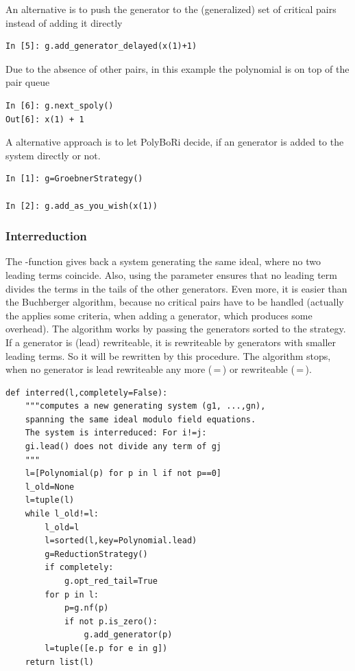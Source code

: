 An alternative is to push the generator to the (generalized) set of critical pairs instead of adding it directly
\begin{lstlisting}
In [5]: g.add_generator_delayed(x(1)+1)
\end{lstlisting}
Due to the absence of other pairs, in this example the polynomial is on top of the pair queue
\begin{lstlisting}
In [6]: g.next_spoly()
Out[6]: x(1) + 1
\end{lstlisting}

A alternative approach is to let PolyBoRi decide, if an generator is added to the system directly or not.
\begin{lstlisting}
In [1]: g=GroebnerStrategy()

In [2]: g.add_as_you_wish(x(1))
\end{lstlisting}

\subsubsection{Interreduction}
The -function gives back a system generating the same ideal, where no two leading terms coincide.
Also, using the parameter  ensures that no leading term divides the terms in the tails of the other generators.
Even more, it is easier than the Buchberger algorithm, because no critical pairs have to be handled (actually the  applies some criteria, when adding a generator, which produces some overhead).
The algorithm works by passing the generators sorted to the strategy. If a generator is (lead) rewriteable, it is rewriteable by generators with smaller leading terms.
So it will be rewritten by this procedure.
The algorithm stops, when no generator is lead rewriteable any more (\,=\,) or rewriteable (\,=\,).
\begin{lstlisting}
def interred(l,completely=False):
    """computes a new generating system (g1, ...,gn), 
    spanning the same ideal modulo field equations.
    The system is interreduced: For i!=j: 
    gi.lead() does not divide any term of gj
    """
    l=[Polynomial(p) for p in l if not p==0]
    l_old=None
    l=tuple(l)
    while l_old!=l:
        l_old=l
        l=sorted(l,key=Polynomial.lead)
        g=ReductionStrategy()
        if completely:
            g.opt_red_tail=True
        for p in l:
            p=g.nf(p)
            if not p.is_zero():
                g.add_generator(p)
        l=tuple([e.p for e in g])
    return list(l)
\end{lstlisting}

